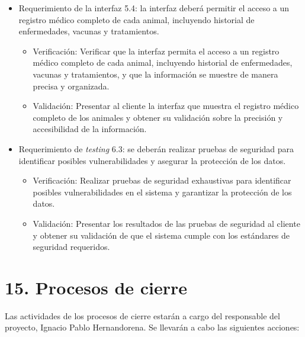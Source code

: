 \documentclass[
11pt, %
]{charter}
\begin{document}
\begin{itemize}
\item Requerimiento de la interfaz 5.4: la interfaz deberá permitir el acceso a un registro médico completo de cada animal,
incluyendo historial de enfermedades, vacunas y tratamientos.
\begin{itemize}
\item Verificación: Verificar que la interfaz permita el acceso a un registro médico completo de cada animal, incluyendo historial de enfermedades, vacunas y tratamientos, y que la información se muestre de manera precisa y organizada.
\item Validación: Presentar al cliente la interfaz que muestra el registro médico completo de los animales y obtener su validación sobre la precisión y accesibilidad de la información.
\end{itemize}
\end{itemize}

\begin{itemize}
\item Requerimiento de \emph{testing} 6.3: se deberán realizar pruebas de seguridad para identificar posibles vulnerabilidades y
asegurar la protección de los datos.
\begin{itemize}
\item Verificación: Realizar pruebas de seguridad exhaustivas para identificar posibles vulnerabilidades en el sistema y garantizar la protección de los datos.
\item Validación: Presentar los resultados de las pruebas de seguridad al cliente y obtener su validación de que el sistema cumple con los estándares de seguridad requeridos.
\end{itemize}
\end{itemize}

\section{15. Procesos de cierre}    
\label{sec:cierre}

Las actividades de los procesos de cierre estarán a cargo del responsable del proyecto, Ignacio Pablo Hernandorena. Se llevarán a cabo las siguientes acciones:
\end{document}
